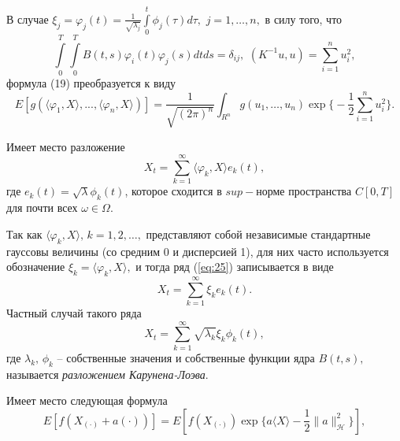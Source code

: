 \documentclass [12pt]{report}
\begin{document}
В случае $\xi_j=\varphi_j(t)=\frac{1}{\sqrt{\lambda_j}}
\int\limits_0^t \phi_j(\tau)d\tau, \,\, j=1,\ldots,n,$ в силу того, что
$$
\int\limits_0^T\int\limits_0^T B(t,s)\varphi_i(t)\varphi_j(s) dtds=\delta_{ij}, \,\,
(K^{-1}u,u)=\sum_{i=1}^{n}u_i^2,
$$
формула (19) преобразуется к виду
\begin{equation}\label{eq:24}
E[g(\langle\varphi_1,X\rangle,...,\langle\varphi_n,X\rangle)]=
\frac{1}{\sqrt{(2\pi)^n}}
\int_{R^n}g(u_1,\ldots,u_n)\exp\Big\{-\frac{1}{2}
\sum_{i=1}^{n}u_i^2\Big\}.
\end{equation}

Имеет место разложение
\begin{equation}\label{eq:25}
X_t=\sum\limits_{k=1}^\infty \langle\varphi_k, X\rangle e_k(t),
\end{equation}
где $e_k(t)=\sqrt{\lambda}\phi_k(t)$, которое
сходится в $sup-$норме пространства $C[0,T]$ для почти всех $\omega\in\Omega.$

Так как $\langle\varphi_k, X\rangle, \, k=1,2,\ldots,$ представляют собой
независимые стандартные гауссовы величины (со средним 0 и дисперсией 1),
для них часто используется обозначение $\xi_k=\langle\varphi_k, X\rangle,$
и тогда ряд (\ref{eq:25}) записывается в виде
\begin{equation}\label{eq:26}
X_t=\sum\limits_{k=1}^\infty \xi_k e_k(t).
\end{equation}
Частный случай такого ряда
\begin{equation}\label{eq:27}
X_t=\sum\limits_{k=1}^\infty \sqrt{\lambda_k}\xi_k \phi_k(t),
\end{equation}
где $\lambda_k, \, \phi_k $ -- собственные значения и собственные функции
ядра $B(t,s),$ называется \emph{разложением Карунена-Лоэва}.


Имеет место следующая формула
\begin{equation}\label{eq:28}
E[f(X_{(\cdot)}+a(\cdot))]=
E[f(X_{(\cdot)})\exp\{a\langle X\rangle-
\frac{1}{2}\|a\|_\mathcal{H}^2\}],
\end{equation}
\end{document}
